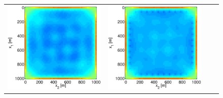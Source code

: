 \documentclass{iopart}
\begin{document}
\begin{figure}
\centering
\begin{tabular}{cccc}
\includegraphics[scale=.2]{./figs/2D_exp0_a}&
\includegraphics[scale=.2]{./figs/2D_exp0_b}&

\end{tabular}
\end{figure}
\end{document}
